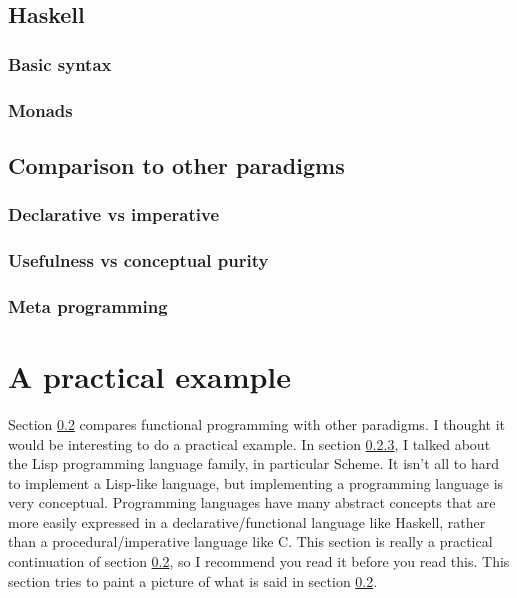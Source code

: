 \documentclass[11pt]{article}
\begin{document}
\subsection{Haskell}\label{haskell}

\subsubsection{Basic syntax}

\subsubsection{Monads}

\subsection{Comparison to other paradigms}\label{comparison}

\subsubsection{Declarative vs imperative}

\subsubsection{Usefulness vs conceptual purity}\label{usefulness}

\subsubsection{Meta programming}\label{metaprogramming}

\section{A practical example}

Section \ref{comparison} compares functional programming with other paradigms.
I thought it would be interesting to do a practical example. In section
\ref{metaprogramming}, I talked about the Lisp programming language family, in
particular Scheme. It isn't all to hard to implement a Lisp-like language, but
implementing a programming language is very conceptual. Programming languages
have many abstract concepts that are more easily expressed in a
declarative/functional language like Haskell, rather than a
procedural/imperative language like C. This section is really a practical
continuation of section \ref{comparison}, so I recommend you read it before you
read this. This section tries to paint a picture of what is said in section
\ref{comparison}.
\end{document}
